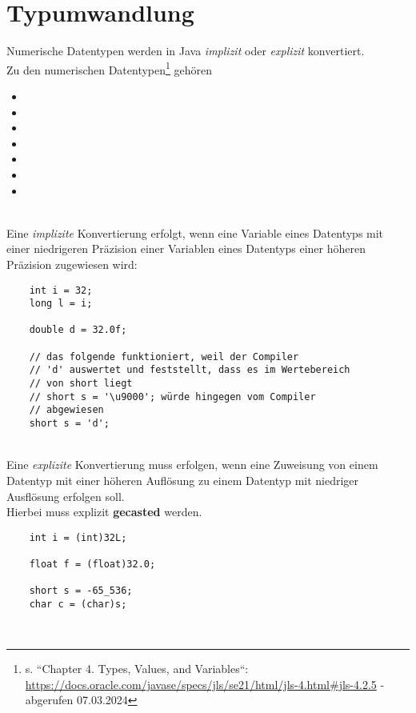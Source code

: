 \section{Typumwandlung}


Numerische Datentypen werden in Java \textit{implizit} oder \textit{explizit} konvertiert.\\

\noindent
Zu den numerischen Datentypen\footnote{
s. ``Chapter 4. Types, Values, and Variables``: \url{https://docs.oracle.com/javase/specs/jls/se21/html/jls-4.html#jls-4.2.5} - abgerufen 07.03.2024
} gehören

\begin{itemize}
    \item {}
    \item {}
    \item {}
    \item {}
    \item {}
    \item {}
    \item {}
\end{itemize}\\



\noindent
Eine \textit{implizite} Konvertierung erfolgt, wenn eine Variable eines Datentyps mit einer niedrigeren Präzision einer Variablen eines Datentyps einer höheren Präzision zugewiesen wird:

\begin{verbatim}
    int i = 32;
    long l = i;

    double d = 32.0f;

    // das folgende funktioniert, weil der Compiler
    // 'd' auswertet und feststellt, dass es im Wertebereich
    // von short liegt
    // short s = '\u9000'; würde hingegen vom Compiler
    // abgewiesen
    short s = 'd';
\end{verbatim}\\

\noindent
Eine \textit{explizite} Konvertierung muss erfolgen, wenn eine Zuweisung von einem Datentyp mit einer höheren Auflösung zu einem Datentyp mit niedriger Ausflösung erfolgen soll.\\
Hierbei muss explizit \textbf{gecasted} werden.

\begin{verbatim}
    int i = (int)32L;

    float f = (float)32.0;

    short s = -65_536;
    char c = (char)s;
\end{verbatim}\\

